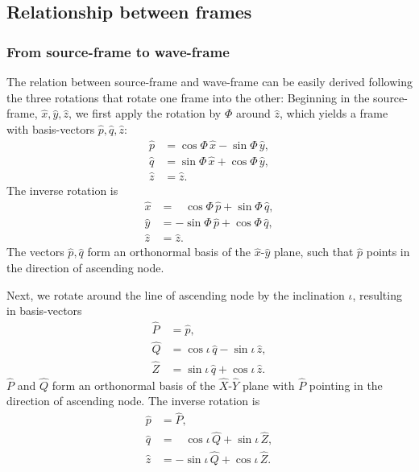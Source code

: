 \documentclass[11pt,tightenlines,article,amssymb,amsmath,amsfonts,superscriptaddress]{revtex4}
\newcommand{\ExS}{{{\hat x}}}
\newcommand{\EyS}{{{\hat y}}}
\newcommand{\EzS}{{{\hat z}}}
\newcommand{\ExW}{\hat X}
\newcommand{\EyW}{\hat Y}
\newcommand{\EzW}{\hat Z}
\newcommand{\phiRef}{\Phi} %
\begin{document}
\subsection{Relationship between frames}
\label{sec:Relations}

\subsubsection{From source-frame to wave-frame}

The relation between source-frame and wave-frame can be easily derived
following the three rotations that rotate one frame into the other:
Beginning in the source-frame, $\ExS, \EyS, \EzS$, we first apply the rotation
by $\phiRef$ around $\EzS$, which yields a frame with basis-vectors $\hat p, \hat q, \EzS$:
\begin{subequations}
  \label{eq:phiRef-Rotation1}
\begin{align}
  \hat p &= \cos\phiRef\,\ExS - \sin\phiRef\,\EyS,\\
  \hat q &= \sin\phiRef\,\ExS+\cos\phiRef\,\EyS,\\
  \EzS & = \EzS.
\end{align}
\end{subequations}
The inverse rotation is
\begin{subequations}
  \label{eq:phiRef-Rotation2}
\begin{align}
  \ExS &= \;\;\;\cos\phiRef\,\hat p + \sin\phiRef\,\hat q,\\
  \EyS &= -\sin\phiRef\,\hat p+\cos\phiRef\,\hat q,\\
  \EzS & = \EzS.
\end{align}
\end{subequations}
The vectors $\hat p, \hat q$ form an orthonormal basis of the
$\ExS$-$\EyS$ plane, such that $\hat p$ points in the direction of
ascending node.


Next, we rotate around the line of ascending node by the inclination $\iota$,
resulting in basis-vectors
\begin{subequations}
  \label{eq:iota-Rotation1}
\begin{align}
  \hat P&=\hat p,\\
  \hat Q&=\cos\iota\,\hat q - \sin\iota\,\EzS,\\
  \hat Z&=\sin\iota\,\hat q+\cos\iota\,\EzS.
\end{align}
\end{subequations}
 $\hat P$ and $\hat Q$ form an orthonormal basis of the $\ExW$-$\EyW$
plane with $\hat P$ pointing in the direction of ascending node.
The inverse rotation is
\begin{subequations}
  \label{eq:iota-Rotation2}
\begin{align}
  \hat p&=\hat P,\\
  \hat q&=\;\;\;\cos\iota\,\hat Q + \sin\iota\,\EzW,\\
  \EzS &=-\sin\iota\,\hat Q+\cos\iota\,\EzW.
\end{align}
\end{subequations}
\end{document}
